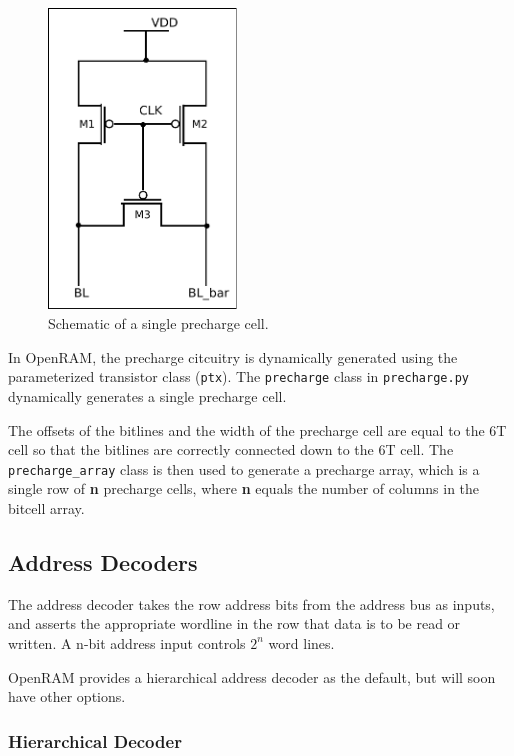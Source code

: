 \begin{figure}[h!]
\centering
\includegraphics[width=5cm]{./figs/precharge_schem.pdf}
\caption{Schematic of a single precharge cell. }
\label{fig:precharge}
\end{figure}

In OpenRAM, the precharge citcuitry is dynamically generated using the
parameterized transistor class (\verb|ptx|). The \verb|precharge|
class in \verb|precharge.py| dynamically generates a single precharge cell.

The offsets of the bitlines and the width of the precharge cell are
equal to the 6T cell so that the bitlines are correctly connected down
to the 6T cell.  The \verb|precharge_array| class is then used to
generate a precharge array, which is a single row of \textbf{n}
precharge cells, where \textbf{n} equals the number of columns in the
bitcell array.


\subsection{Address Decoders}
\label{sec:addressdecoder}

The address decoder takes the row address bits from the address bus as
inputs, and asserts the appropriate wordline in the row that data is
to be read or written.  A n-bit address input controls $2^n$ word
lines. 

OpenRAM provides a hierarchical address decoder as the default, but
will soon have other options.

\subsubsection{Hierarchical Decoder}
\label{sec:hierdecoder}

